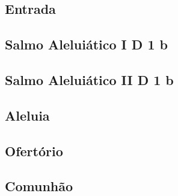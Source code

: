 
\subsection{Entrada}\label{subsection:tempus-paschale/missa-1/introitus}

\subsection[Salmo Aleluiático I]{Salmo Aleluiático I \textmd{D 1 b}}\label{subsection:tempus-paschale/missa-1/psalmus-alleluiaticus-1}

\AllowPageFlush

\subsection[Salmo Aleluiático II]{Salmo Aleluiático II \textmd{D 1 b}}\label{subsection:tempus-paschale/missa-1/psalmus-alleluiaticus-2}

\AllowPageFlush

\subsection{Aleluia}\label{subsection:tempus-paschale/missa-1/alleluia}

\AllowPageFlush

\subsection{Ofertório}\label{subsection:tempus-paschale/missa-1/offertorium}

\AllowPageBreak

\subsection{Comunhão}\label{subsection:tempus-paschale/missa-1/communio}
